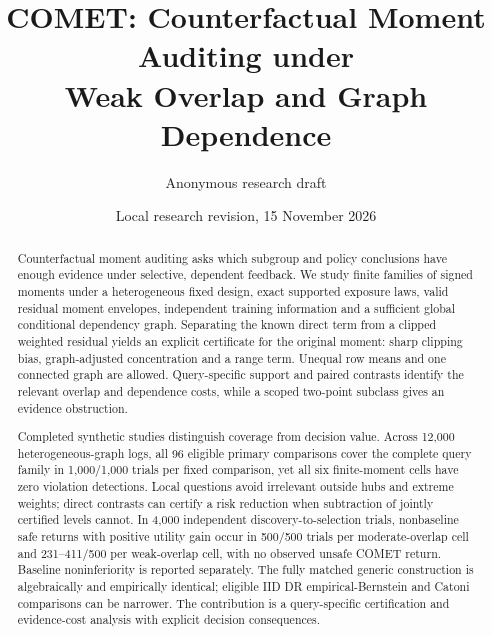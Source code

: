 \documentclass[10pt]{article}
\title{COMET: Counterfactual Moment Auditing under\\Weak Overlap and Graph Dependence}
\author{Anonymous research draft}
\date{Local research revision, 15 November 2026}
\begin{document}
\maketitle

\begin{abstract}
Counterfactual moment auditing asks which subgroup and policy conclusions have
enough evidence under selective, dependent feedback. We study finite families
of signed moments under a heterogeneous fixed design, exact supported exposure
laws, valid residual moment envelopes, independent training information and a
sufficient global conditional dependency graph. Separating the known direct
term from a clipped weighted residual yields an explicit certificate for the
original moment: sharp clipping bias, graph-adjusted concentration and a range
term. Unequal row means and one connected graph are allowed. Query-specific
support and paired contrasts identify the relevant overlap and dependence
costs, while a scoped two-point subclass gives an evidence obstruction.

Completed synthetic studies distinguish coverage from decision value. Across
12,000 heterogeneous-graph logs, all 96 eligible primary comparisons cover the
complete query family in 1,000/1,000 trials per fixed comparison, yet all six
finite-moment cells have zero violation detections. Local questions avoid
irrelevant outside hubs and extreme weights; direct contrasts can certify a
risk reduction when subtraction of jointly certified levels cannot. In 4,000
independent discovery-to-selection trials, nonbaseline safe returns with
positive utility gain occur in 500/500 trials per moderate-overlap cell and
231--411/500 per weak-overlap cell, with no observed unsafe COMET return.
Baseline noninferiority is reported separately. The fully matched generic
construction is algebraically and empirically identical; eligible IID
DR empirical-Bernstein and Catoni comparisons can be narrower. The contribution
is a query-specific certification and evidence-cost analysis with explicit
decision consequences.
\end{abstract}






\end{document}
